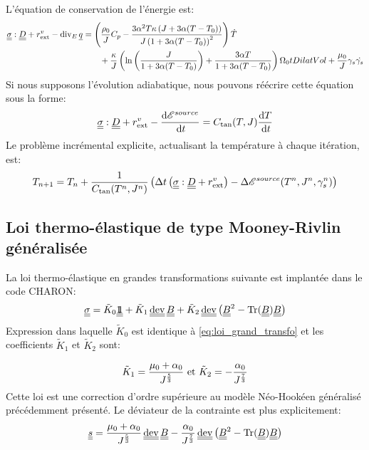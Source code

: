 \documentclass[10pt]{book}
\begin{document}
\begin{appendices}
L'équation de conservation de l'énergie est:
$$\begin{aligned}
\SC:\TD+\PCaloVol-\div_{E}\CourantChal&=\left(\dfrac{\rho_{0}}{\J}C_{p}-\dfrac{3\alpha^{2} T\BulkModulus\left(\J+3\alpha(T-T_{0})\right)}{\J\left(1+3\alpha(T-T_{0})\right)^{2}}\right)\dot{T}\\
&\qquad +\dfrac{\BulkModulus}{\J}\left(\ln\left(\dfrac{\J}{1+3\alpha(T-T_{0})}\right)+\dfrac{3\alpha T}{1+3\alpha(T-T_{0})}\right)\Configuration_{0}tDilatVol+\dfrac{\mu_{0}}{\J}\Glisss\dot{\Glisss}
\end{aligned}$$
Si nous supposons l'évolution adiabatique, nous pouvons réécrire cette équation sous la forme:
$$\underline{\underline{\sigma}}:\underline{\underline{D}}+r^{v}_{\text{ext}}-\dfrac{\mathrm{d}\mathscr{E}^{source}}{\,\mathrm{d}t}=C_{\tan}(T,J)\dfrac{\mathrm{d} T}{\,\mathrm{d}t}$$
Le problème incrémental explicite, actualisant la température à chaque itération, est:
$$T_{n+1}=T_{n}+\dfrac{1}{C_{\tan}(T^{n},J^{n})}\left(\Delta t\left(\underline{\underline{\sigma}}:\underline{\underline{D}}+r^{v}_{\text{ext}}\right)-\Delta\mathscr{E}^{source}(T^{n}, J^{n}, \gamma_{s}^{n})\right)$$
\subsection{Loi thermo-élastique de type Mooney-Rivlin généralisée}
La loi thermo-élastique en grandes transformations suivante est implantée dans le code CHARON:
\begin{equation}
\SC=\tilde{K}_{0}\TU+\tilde{K}_{1}\dev\CGG+\tilde{K}_{2}\dev\left(\CGG^{2}-\tr(\CGG)\CGG\right)
\label{eq:loi_grand_transfo_MR}
\end{equation}
Expression dans laquelle $\tilde{K}_{0}$ est identique à \eqref{eq:loi_grand_transfo} et les coefficients $\tilde{K}_{1}$ et $\tilde{K}_{2}$ sont:

$$\tilde{K}_{1}=\dfrac{\mu_{0}+\alpha_{0}}{J^{\frac{5}{3}}} \text{ et } \tilde{K}_{2}=-\dfrac{\alpha_{0}}{J^\frac{7}{3}}$$
Cette loi est une correction d'ordre supérieure au modèle Néo-Hookéen généralisé précédemment présenté. Le déviateur de la contrainte est plus explicitement:
\begin{equation}
\devia=\dfrac{\mu_{0}+\alpha_{0}}{\J^{\frac{5}{3}}}\dev\CGG-\dfrac{\alpha_{0}}{\J^\frac{7}{3}}\dev\left(\CGG^{2}-\tr(\CGG)\CGG\right)
\label{eq:devia_MR}
\end{equation}


\end{appendices}
\end{document}
